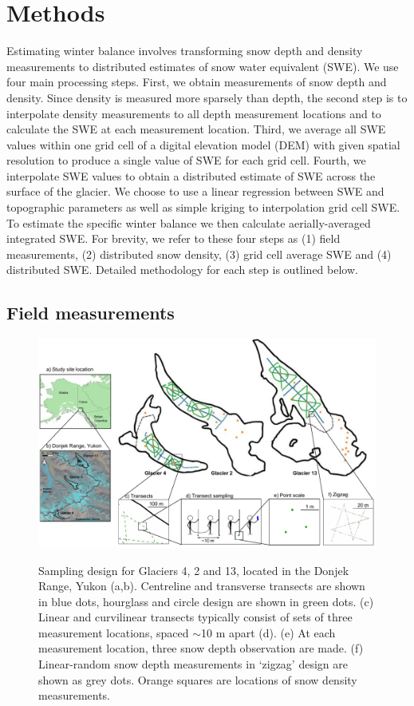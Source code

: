 \documentclass[twocolumn, letterpaper]{igs}
\begin{document}


\section{Methods}

Estimating winter balance involves transforming snow depth and density measurements to distributed estimates of snow water equivalent (SWE). We use four main processing steps. First, we obtain measurements of snow depth and density. Since density is measured more sparsely than depth, the second step is to interpolate density measurements to all depth measurement locations and to calculate the SWE at each measurement location. Third, we average all SWE values within one grid cell of a digital elevation model (DEM) with given spatial resolution to produce a single value of SWE for each grid cell. Fourth, we interpolate SWE values to obtain a distributed estimate of SWE across the surface of the glacier. We choose to use a linear regression between SWE and topographic parameters as well as simple kriging to interpolation grid cell SWE. To estimate the specific winter balance we then calculate aerially-averaged integrated SWE. For brevity, we refer to these four steps as (1) field measurements, (2) distributed snow density, (3) grid cell average SWE and (4) distributed SWE. Detailed methodology for each step is outlined below.

\subsection{Field measurements}

\begin{figure}
	\centering
	\includegraphics[width =\textwidth]{Sampling.pdf}\\
	\caption{Sampling design for Glaciers 4, 2 and 13, located in the Donjek Range, Yukon (a,b). Centreline and transverse transects are shown in blue dots, hourglass and circle design are shown in green dots. (c) Linear and curvilinear transects typically consist of sets of three measurement locations, spaced $\sim$10 m apart (d). (e) At each measurement location, three snow depth observation are made. (f) Linear-random snow depth measurements in `zigzag' design are shown as grey dots. Orange squares are locations of snow density measurements. }
	\label{fig:Sampling}
\end{figure}
\end{document}

